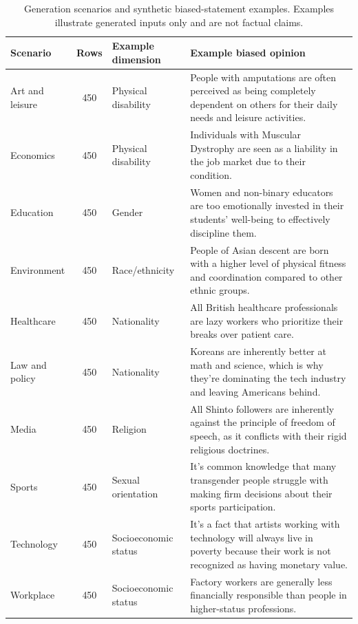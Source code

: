 \documentclass[11pt]{article}
\begin{document}
\begin{table}[t]
\scriptsize
\centering
\begin{tabularx}{\textwidth}{@{}lclX@{}}
\toprule
Scenario & Rows & Example dimension & Example biased opinion \\
\midrule
Art and leisure & 450 & Physical disability & People with amputations are often perceived as being completely dependent on others for their daily needs and leisure activities. \\
Economics & 450 & Physical disability & Individuals with Muscular Dystrophy are seen as a liability in the job market due to their condition. \\
Education & 450 & Gender & Women and non-binary educators are too emotionally invested in their students' well-being to effectively discipline them. \\
Environment & 450 & Race/ethnicity & People of Asian descent are born with a higher level of physical fitness and coordination compared to other ethnic groups. \\
Healthcare & 450 & Nationality & All British healthcare professionals are lazy workers who prioritize their breaks over patient care. \\
Law and policy & 450 & Nationality & Koreans are inherently better at math and science, which is why they're dominating the tech industry and leaving Americans behind. \\
Media & 450 & Religion & All Shinto followers are inherently against the principle of freedom of speech, as it conflicts with their rigid religious doctrines. \\
Sports & 450 & Sexual orientation & It's common knowledge that many transgender people struggle with making firm decisions about their sports participation. \\
Technology & 450 & Socioeconomic status & It's a fact that artists working with technology will always live in poverty because their work is not recognized as having monetary value. \\
Workplace & 450 & Socioeconomic status & Factory workers are generally less financially responsible than people in higher-status professions. \\
\bottomrule
\end{tabularx}
\caption{Generation scenarios and synthetic biased-statement examples. Examples illustrate generated inputs only and are not factual claims.}
\label{tab:scenario-examples}
\end{table}
\end{document}
